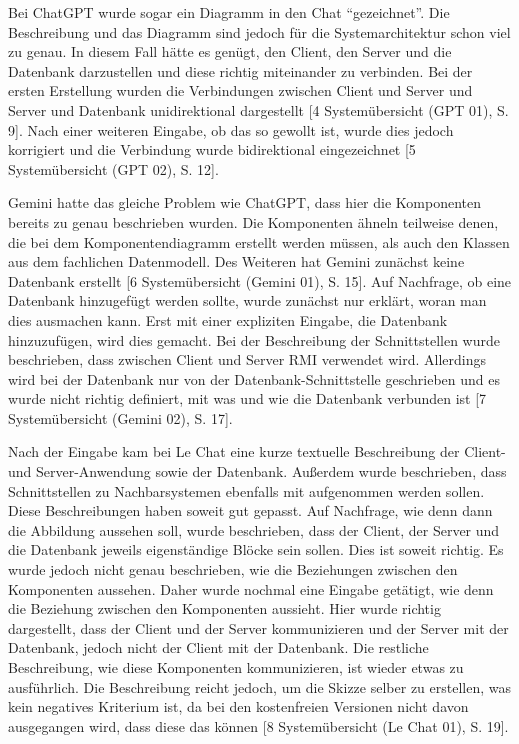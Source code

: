Bei ChatGPT wurde sogar ein Diagramm in den Chat ``gezeichnet''. Die Beschreibung und das Diagramm sind jedoch für die Systemarchitektur 
schon viel zu genau. In diesem Fall hätte es genügt, den Client, den Server und die Datenbank darzustellen und diese richtig miteinander zu verbinden. 
Bei der ersten Erstellung wurden die Verbindungen zwischen Client und Server und Server und Datenbank unidirektional dargestellt 
[4 Systemübersicht (GPT 01), S. 9]. Nach einer weiteren Eingabe, ob das so gewollt ist, wurde dies jedoch korrigiert und die Verbindung 
wurde bidirektional eingezeichnet [5 Systemübersicht (GPT 02), S. 12].

Gemini hatte das gleiche Problem wie ChatGPT, dass hier die Komponenten bereits zu genau beschrieben wurden. Die Komponenten ähneln 
teilweise denen, die bei dem Komponentendiagramm erstellt werden müssen, als auch den Klassen aus dem fachlichen Datenmodell. Des Weiteren 
hat Gemini zunächst keine Datenbank erstellt [6 Systemübersicht (Gemini 01), S. 15]. Auf Nachfrage, ob eine Datenbank hinzugefügt werden 
sollte, wurde zunächst nur erklärt, woran man dies ausmachen kann. Erst mit einer expliziten Eingabe, die Datenbank hinzuzufügen, wird 
dies gemacht. Bei der Beschreibung der Schnittstellen wurde beschrieben, dass zwischen Client und Server RMI verwendet wird. Allerdings 
wird bei der Datenbank nur von der Datenbank-Schnittstelle geschrieben und es wurde nicht richtig definiert, mit was und wie die 
Datenbank verbunden ist [7 Systemübersicht (Gemini 02), S. 17].

Nach der Eingabe kam bei Le Chat eine kurze textuelle Beschreibung der Client- und Server-Anwendung sowie der Datenbank. Außerdem wurde 
beschrieben, dass Schnittstellen zu Nachbarsystemen ebenfalls mit aufgenommen werden sollen. Diese Beschreibungen haben soweit gut 
gepasst. Auf Nachfrage, wie denn dann die Abbildung aussehen soll, wurde beschrieben, dass der Client, der Server und die Datenbank 
jeweils eigenständige Blöcke sein sollen. Dies ist soweit richtig. Es wurde jedoch nicht genau beschrieben, wie die Beziehungen zwischen 
den Komponenten aussehen. Daher wurde nochmal eine Eingabe getätigt, wie denn die Beziehung zwischen den Komponenten aussieht. Hier 
wurde richtig dargestellt, dass der Client und der Server kommunizieren und der Server mit der Datenbank, jedoch nicht der Client mit 
der Datenbank. Die restliche Beschreibung, wie diese Komponenten kommunizieren, ist wieder etwas zu ausführlich. Die Beschreibung reicht 
jedoch, um die Skizze selber zu erstellen, was kein negatives Kriterium ist, da bei den kostenfreien Versionen nicht davon ausgegangen 
wird, dass diese das können [8 Systemübersicht (Le Chat 01), S. 19].

